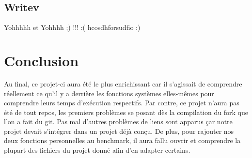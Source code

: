 \documentclass[11pt, oneside]{article}
\begin{document}
\begin{multicols}{2}
\subsection{Writev}
Yohhhhh et Yohhhh ;) !!! :( hcosdhforsudfio :)


\section{Conclusion}
Au final, ce projet-ci aura été le plus enrichissant car il s'agissait de comprendre réellement ce qu'il y a derrière les fonctions systèmes elles-mêmes pour comprendre leurs temps d'exécution respectifs. Par contre, ce projet n'aura pas été de tout repos, les premiers problèmes se posant dès la compilation du fork que l'on a fait du git. Pas mal d'autres problèmes de liens sont apparus çar notre projet devait s'intégrer dans un projet déjà conçu. De plus, pour rajouter nos deux fonctions personnelles au benchmark, il aura fallu ouvrir et comprendre la plupart des fichiers du projet donné afin d'en adapter certains. 
\end{multicols}
\end{document}
